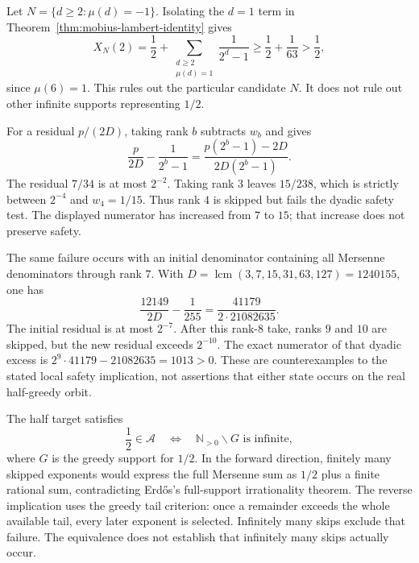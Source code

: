 \begin{cor}
\label{cor:negative-mobius-overshoot}
Let $N=\{d\ge2:\mu(d)=-1\}$.  Isolating the $d=1$
term in Theorem~\ref{thm:mobius-lambert-identity} gives
\[
 X_N(2)=\frac12+
       \sum_{\substack{d\ge2\\\mu(d)=1}}\frac1{2^d-1}
       \ge\frac12+\frac1{63}>\frac12,
\]
since $\mu(6)=1$.  This rules out the particular candidate $N$.
It does not rule out other infinite supports representing $1/2$.
\end{cor}

\begin{obs}
\label{obs:skip-block-non-invariant}
For a residual $p/(2D)$, taking rank $b$ subtracts $w_b$ and gives
\[
 \frac{p}{2D}-\frac1{2^b-1}
 =\frac{p(2^b-1)-2D}{2D(2^b-1)}.
\]
The residual $7/34$ is at most $2^{-2}$.  Taking rank $3$ leaves
$15/238$, which is strictly between $2^{-4}$ and $w_4=1/15$.
Thus rank $4$ is skipped but fails the dyadic safety test.  The displayed
numerator has increased from $7$ to $15$; that increase does not preserve
safety.

The same failure occurs with an initial denominator containing all
Mersenne denominators through rank $7$.  With
$D=\operatorname{lcm}(3,7,15,31,63,127)=1240155$, one has
\[
 \frac{12149}{2D}-\frac1{255}
 =\frac{41179}{2\cdot21082635}.
\]
The initial residual is at most $2^{-7}$.  After this rank-$8$ take,
ranks $9$ and $10$ are skipped, but the new residual exceeds $2^{-10}$.
The exact numerator of that dyadic excess is
$2^9\cdot41179-21082635=1013>0$.
These are counterexamples to the stated local safety implication,
not assertions that either state occurs on the real half-greedy orbit.
\par
{}
\end{obs}

\begin{thm}
\label{thm:half-skip-dichotomy}
The half target satisfies
\[
 \frac12\in\mathcal A\quad\Longleftrightarrow\quad
 \mathbb N_{>0}\smallsetminus G\text{ is infinite},
\]
where $G$ is the greedy support for $1/2$.  In the forward direction,
finitely many skipped exponents would express the full Mersenne sum as
$1/2$ plus a finite rational sum, contradicting Erd\H{o}s's full-support
irrationality theorem.  The reverse implication uses the greedy
tail criterion: once a remainder exceeds the whole available tail,
every later exponent is selected.  Infinitely many skips exclude that
failure.  The equivalence does not establish that infinitely many skips
actually occur.
\end{thm}


